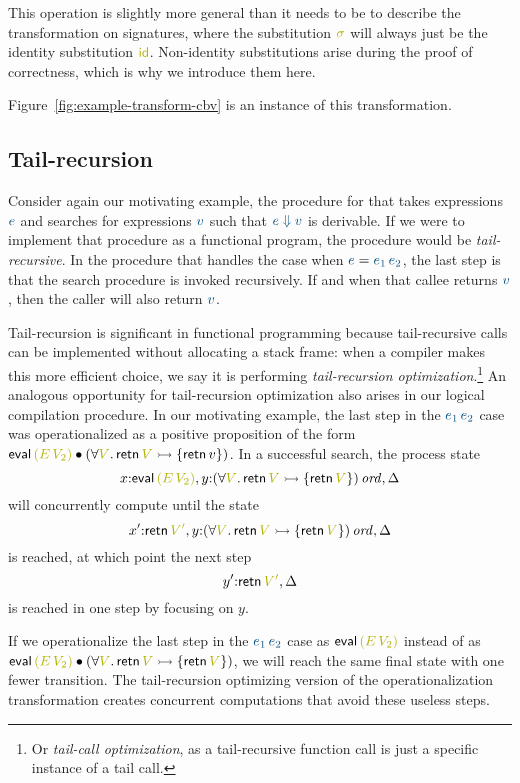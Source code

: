 \noindent
This operation is slightly more general than it needs to be to
describe the transformation on signatures, where the substitution
$\lf\sigma$ will always just be the identity substitution $\lf{\sf id}$.
Non-identity substitutions arise during the proof of correctness, which
is why we introduce them here.

Figure~\ref{fig:example-transform-cbv} is an
instance of this transformation.

\subsection{Tail-recursion}
\label{sec:trans-tail}

Consider again our motivating example, the procedure for that takes
expressions $\obj{e}$ and searches for expressions $\obj{v}$ such that 
$\obj{e \Downarrow v}$ is derivable. If we were to implement that procedure as
a functional program, the procedure would be {\it tail-recursive}. In
the procedure that handles the case when $\obj{e} = \obj{e_1\,e_2}$, 
the last step
is that the search procedure is invoked recursively. If and when that
callee returns $\obj{v}$, then the caller will also return $\obj{v}$.

Tail-recursion is significant in functional programming because
tail-recursive calls can be implemented without allocating a stack
frame: when a compiler makes this more efficient choice, we say it is
performing {\it tail-recursion optimization}.\footnote{Or {\it tail-call optimization}, as a tail-recursive function call is just a
  specific instance of a tail call.} An analogous opportunity for
tail-recursion optimization also arises in our logical compilation
procedure. In our motivating example, the last step in the $\obj{e_1\,e_2}$
case was operationalized as a positive proposition of the form ${\sf
  eval}\,\lf{(E\, V_2)} \fuse (\forall \lf{V}.\,{\sf retn}\,\lf{V} \lefti \{ {\sf
  retn}\,v \})$. In a successful search, the process state 
\[ x{:}{\sf
  eval}\,\lf{(E\, V_2)}, y{:}\istrue{(\forall \lf{V}.\,{\sf retn}\,\lf{V} \lefti \{
  {\sf retn}\,\lf{V} \})}, \Delta\]
will concurrently compute until the
state 
\[ x'{:}{\sf retn}\,\lf{V'}, y{:}\istrue{(\forall \lf{V}.\,{\sf retn}\,\lf{V} \lefti
  \{ {\sf retn}\,\lf{V} \})}, \Delta\] is reached, at which point the next
step \[y'{:}{\sf retn}\,\lf{V'}, \Delta\] is reached in one step by focusing
on $y$. 

If we operationalize the last step in the $\obj{e_1\,e_2}$ case as ${\sf
  eval}\,\lf{(E\,V_2)}$ instead of as ${\sf eval}\,\lf{(E\, V_2)} \fuse (\forall
\lf{V}.\,{\sf retn}\,\lf{V} \lefti \{ {\sf retn}\,\lf{V} \})$, we will reach the same
final state with one fewer transition. The tail-recursion optimizing
version of the operationalization transformation creates concurrent
computations that avoid these useless steps.

